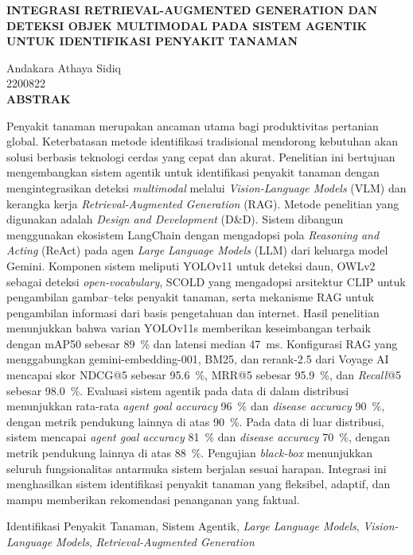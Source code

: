 \documentclass[12pt, a4paper, oneside]{report}
\newcommand{\wordonespacing}{0.955212}
\newenvironment{abstract-id}{
    \clearpage
    \setstretch{\wordonespacing}
    \fontsize{11pt}{13pt}\selectfont
}{
    \par
}
\newcommand{\thesistitle}{INTEGRASI RETRIEVAL-AUGMENTED GENERATION DAN DETEKSI OBJEK MULTIMODAL PADA SISTEM AGENTIK UNTUK IDENTIFIKASI PENYAKIT TANAMAN}
\newcommand{\authorname}{Andakara Athaya Sidiq}
\newcommand{\studentid}{2200822}
\begin{document}
\begin{abstract-id}
    \begin{center}
        {\bfseries \MakeUppercase{\thesistitle} \par}
        \vspace{2em}
        \authorname \\
        \studentid \\
        \vspace{2em}
        {\bfseries ABSTRAK}
    \end{center}
    \vspace{-0.5em}
    Penyakit tanaman merupakan ancaman utama bagi produktivitas pertanian global. Keterbatasan metode identifikasi tradisional mendorong kebutuhan akan solusi berbasis teknologi cerdas yang cepat dan akurat. Penelitian ini bertujuan mengembangkan sistem agentik untuk identifikasi penyakit tanaman dengan mengintegrasikan deteksi \textit{multimodal} melalui \textit{Vision-Language Models} (VLM) dan kerangka kerja \textit{Retrieval-Augmented Generation} (RAG). Metode penelitian yang digunakan adalah \textit{Design and Development} (D\&D). Sistem dibangun menggunakan ekosistem LangChain dengan mengadopsi pola \textit{Reasoning and Acting} (ReAct) pada agen \textit{Large Language Models} (LLM) dari keluarga model Gemini. Komponen sistem meliputi YOLOv11 untuk deteksi daun, OWLv2 sebagai deteksi \textit{open-vocabulary}, SCOLD yang mengadopsi arsitektur CLIP untuk pengambilan gambar–teks penyakit tanaman, serta mekanisme RAG untuk pengambilan informasi dari basis pengetahuan dan internet. Hasil penelitian menunjukkan bahwa varian YOLOv11s memberikan keseimbangan terbaik dengan mAP50 sebesar \qty{89}{\percent} dan latensi median \qty{47}{ms}. Konfigurasi RAG yang menggabungkan gemini-embedding-001, BM25, dan rerank-2.5 dari Voyage AI mencapai skor NDCG@5 sebesar \qty{95.6}{\percent}, MRR@5 sebesar \qty{95.9}{\percent}, dan \textit{Recall}@5 sebesar \qty{98.0}{\percent}. Evaluasi sistem agentik pada data di dalam distribusi menunjukkan rata-rata \textit{agent goal accuracy} \qty{96}{\percent} dan \textit{disease accuracy} \qty{90}{\percent}, dengan metrik pendukung lainnya di atas \qty{90}{\percent}. Pada data di luar distribusi, sistem mencapai \textit{agent goal accuracy} \qty{81}{\percent} dan \textit{disease accuracy} \qty{70}{\percent}, dengan metrik pendukung lainnya di atas \qty{88}{\percent}. Pengujian \textit{black-box} menunjukkan seluruh fungsionalitas antarmuka sistem berjalan sesuai harapan. Integrasi ini menghasilkan sistem identifikasi penyakit tanaman yang fleksibel, adaptif, dan mampu memberikan rekomendasi penanganan yang faktual.
    
    \vspace{1em}
     Identifikasi Penyakit Tanaman, Sistem Agentik, \textit{Large Language Models}, \textit{Vision-Language Models}, \textit{Retrieval-Augmented Generation}
\end{abstract-id}
\end{document}
